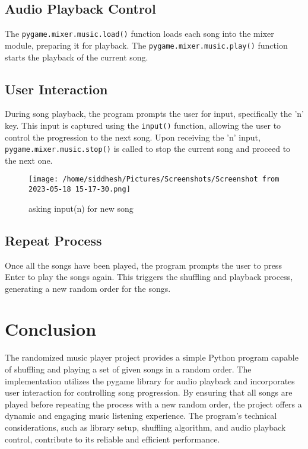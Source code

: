 \documentclass{article}
\begin{document}
\subsection{Audio Playback Control}
The \texttt{pygame.mixer.music.load()} function loads each song into the mixer module, preparing it for playback. The \texttt{pygame.mixer.music.play()} function starts the playback of the current song.

\subsection{User Interaction}
During song playback, the program prompts the user for input, specifically the 'n' key. This input is captured using the \texttt{input()} function, allowing the user to control the progression to the next song. Upon receiving the 'n' input, \texttt{pygame.mixer.music.stop()} is called to stop the current song and proceed to the next one.

\begin{figure}[h]
    \centering
    \texttt{[image: /home/siddhesh/Pictures/Screenshots/Screenshot from 2023-05-18 15-17-30.png]}
    \caption{asking input(n) for new song}
    \label{fig:my_label}
\end{figure}

\subsection{Repeat Process}
Once all the songs have been played, the program prompts the user to press Enter to play the songs again. This triggers the shuffling and playback process, generating a new random order for the songs.

\section{Conclusion}
The randomized music player project provides a simple Python program capable of shuffling and playing a set of given songs in a random order. The implementation utilizes the pygame library for audio playback and incorporates user interaction for controlling song progression. By ensuring that all songs are played before repeating the process with a new random order, the project offers a dynamic and engaging music listening experience. The program's technical considerations, such as library setup, shuffling algorithm, and audio playback control, contribute to its reliable and efficient performance. 
\end{document}
